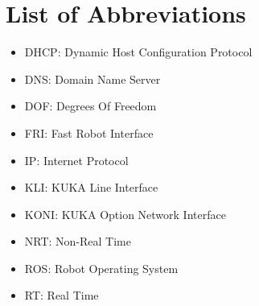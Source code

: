 \chapter*{List of Abbreviations}
\begin{itemize}
\itemsep 5pt
\item DHCP: Dynamic Host Configuration Protocol\\
\item DNS: Domain Name Server\\
\item DOF: Degrees Of Freedom\\
\item FRI: Fast Robot Interface\\
\item IP: Internet Protocol\\
\item KLI: KUKA Line Interface\\
\item KONI: KUKA Option Network Interface\\
\item NRT: Non-Real Time\\
\item ROS: Robot Operating System\\
\item RT: Real Time\\
\end{itemize}



      
